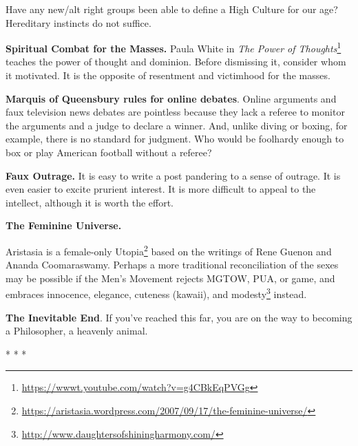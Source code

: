 Have any new/alt right groups been able to define a High Culture for our age? Hereditary instincts do not suffice.

\textbf{Spiritual Combat for the Masses.} Paula White in \textit{The Power of Thoughts}\footnote{\url{https://wwwt.youtube.com/watch?v=g4CBkEqPVGg}} teaches the power of thought and dominion. Before dismissing it, consider whom it motivated. It is the opposite of resentment and victimhood for the masses.

\textbf{Marquis of Queensbury rules for online debates}. Online arguments and faux television news debates are pointless because they lack a referee to monitor the arguments and a judge to declare a winner. And, unlike diving or boxing, for example, there is no standard for judgment. Who would be foolhardy enough to box or play American football without a referee?

\textbf{Faux Outrage.} It is easy to write a post pandering to a sense of outrage. It is even easier to excite prurient interest. It is more difficult to appeal to the intellect, although it is worth the effort.

\textbf{The Feminine Universe.}

Aristasia is a female-only Utopia\footnote{\url{https://aristasia.wordpress.com/2007/09/17/the-feminine-universe/}} based on the writings of Rene Guenon and Ananda Coomaraswamy. Perhaps a more traditional reconciliation of the sexes may be possible if the Men's Movement rejects MGTOW, PUA, or game, and embraces innocence, elegance, cuteness (kawaii), and modesty\footnote{\url{http://www.daughtersofshiningharmony.com/}} instead.

\textbf{The Inevitable End}. If you've reached this far, you are on the way to becoming a Philosopher, a heavenly animal.



\begin{center}* * *\end{center}


